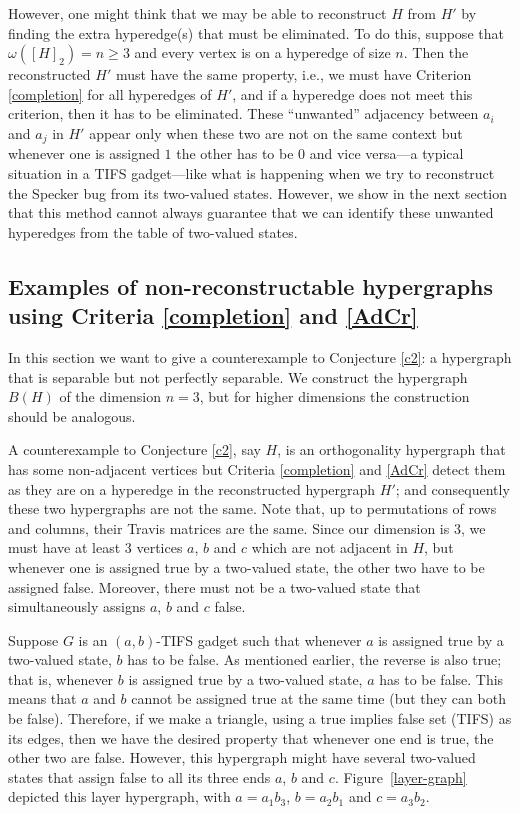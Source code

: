\documentclass[%
12pt,
prereprint,
showpacs,
showkeys,
preprintnumbers,
amsmath,amssymb,
aps,
pra,
longbibliography,
notitlepage
]{revtex4-1}
\theoremstyle{definition}
\begin{document}
        However, one might think that we may be able to reconstruct $H$ from $H'$ by finding the extra hyperedge(s) that must be eliminated. To do this, suppose that $\omega([H]_2 )=n\geq 3$ and every vertex is on a hyperedge of size $n$. Then the reconstructed $H'$ must have the same property, i.e., we must have Criterion \ref{completion} for all hyperedges of $H'$, and if a hyperedge does not meet this criterion, then it has to be eliminated. These ``unwanted'' adjacency between $a_i$ and $a_j$ in $H'$ appear only when these two are not on the same context but whenever one is assigned $1$ the other has to be $0$ and vice versa---a typical situation in a TIFS gadget---like what is happening when we try to reconstruct the Specker bug from its two-valued states. However, we show in the next section that this method cannot always guarantee that we can identify these unwanted hyperedges from the table of two-valued states.


        \subsection{Examples of non-reconstructable hypergraphs using Criteria \ref{completion} and  \ref{AdCr}}\label{Rec-B(H)}


        In this section we want to give a counterexample to Conjecture \ref{c2}: a hypergraph that is separable but not perfectly separable. We construct the hypergraph $B(H)$ of the dimension $n=3$, but for higher dimensions the construction should be analogous.

        A counterexample to Conjecture \ref{c2}, say $H$, is an orthogonality hypergraph that has some non-adjacent vertices but Criteria \ref{completion} and \ref{AdCr} detect them as they are on a hyperedge in the reconstructed hypergraph $H'$; and consequently these two hypergraphs are not the same. Note that, up to permutations of rows and columns, their Travis matrices are the same. Since our dimension is 3, we must have at least 3 vertices $a$, $b$ and $c$ which are not adjacent in $H$, but whenever one is assigned true by a two-valued state, the other two  have to be assigned false. Moreover, there must not be a two-valued state that simultaneously assigns $a$, $b$ and $c$ false.

        Suppose $G$ is an $(a,b)$-TIFS gadget such that whenever $a$ is assigned true by a two-valued state, $b$ has to be false. As mentioned earlier, the reverse is also true; that is, whenever $b$ is assigned true by a two-valued state, $a$ has to be false. This means that $a$ and $b$ cannot be assigned true at the same time (but they can both be false). Therefore, if we make a triangle, using a true implies false set (TIFS) as its edges, then we have the desired property that whenever one end is true, the other two are false. However, this hypergraph might have several two-valued states that assign false to all its three ends $a$, $b$ and $c$.  Figure~\ref{layer-graph} depicted this layer hypergraph, with $a=a_1 b_3$, $b=a_2 b_1$ and $c=a_3 b_2$.
\end{document}
